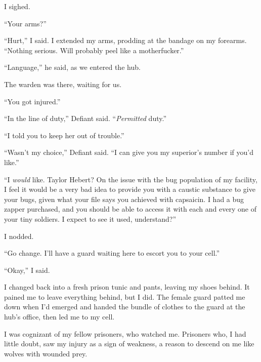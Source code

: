 I sighed.



``Your arms?''



``Hurt,'' I said.  I extended my arms, prodding at the bandage on my forearms.  ``Nothing serious.  Will probably peel like a motherfucker.''



``Language,'' he said, as we entered the hub.



The warden was there, waiting for us.



``You got injured.''



``In the line of duty,'' Defiant said.  ``\emph{Permitted} duty.''



``I told you to keep her out of trouble.''



``Wasn't my choice,'' Defiant said.  ``I can give you my superior's number if you'd like.''



``I \emph{would} like.  Taylor Hebert?  On the issue with the bug population of my facility, I feel it would be a very bad idea to provide you with a caustic substance to give your bugs, given what your file says you achieved with capsaicin.  I had a bug zapper purchased, and you should be able to access it with each and every one of your tiny soldiers.  I expect to see it used, understand?''



I nodded.



``Go change.  I'll have a guard waiting here to escort you to your cell.''



``Okay,'' I said.



I changed back into a fresh prison tunic and pants, leaving my shoes behind.  It pained me to leave everything behind, but I did.  The female guard patted me down when I'd emerged and handed the bundle of clothes to the guard at the hub's office, then led me to my cell.



I was cognizant of my fellow prisoners, who watched me.  Prisoners who, I had little doubt, saw my injury as a sign of weakness, a reason to descend on me like wolves with wounded prey.



